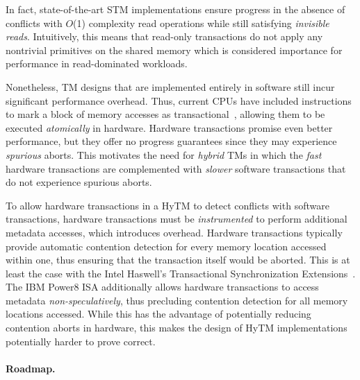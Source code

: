 In fact, state-of-the-art STM implementations ensure progress in the absence of conflicts with 
$O$(1) complexity read operations while still satisfying \emph{invisible reads}.
Intuitively, this means that read-only transactions do not
apply any nontrivial primitives on the shared memory which is considered importance for performance in
read-dominated workloads.

Nonetheless, TM designs that are implemented entirely in software still incur significant performance overhead.
Thus, current CPUs have included instructions to mark a block of memory accesses as transactional~\cite{Rei12, asf, bluegene}, allowing them to be executed \emph{atomically} in hardware.
Hardware transactions promise even better performance, but they offer no progress guarantees 
since they may experience %
\emph{spurious} aborts. This motivates the need for
\emph{hybrid} TMs in which the \emph{fast} hardware transactions are 
complemented with \emph{slower} software transactions that do not experience spurious aborts.

To allow hardware transactions in a HyTM to detect conflicts with software transactions, 
hardware transactions must be \emph{instrumented} to perform additional metadata accesses, which introduces overhead.
Hardware transactions typically provide automatic contention detection for every memory location accessed within one,
thus ensuring that the transaction itself would be aborted.
This is at least the case with the Intel Haswell's Transactional Synchronization Extensions~\cite{haswell}.
The IBM Power8 ISA additionally allows hardware transactions to access metadata \emph{non-speculatively}, thus precluding
contention detection for all memory locations accessed. While this has the advantage of potentially reducing contention aborts
in hardware, this makes the design of HyTM implementations potentially harder to prove correct.


\paragraph{Roadmap.}